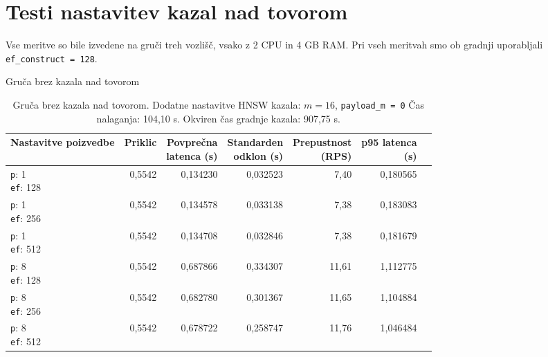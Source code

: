 \section{Testi nastavitev kazal nad tovorom}

Vse meritve so bile izvedene na gruči treh vozlišč, vsako z 2 CPU in 4 GB RAM. Pri vseh meritvah smo ob gradnji uporabljali \texttt{ef\_construct = 128}.

\begin{table}[htbp]
  \centering
\small
  \caption{Gruča brez kazala nad tovorom}
  \label{tab:cluster-2cpu-4ram:no-payload-index:qdrant-dipl-baseline-tenant-no-subgraph-2-m-16-ef-128-random-768-100-tenants-extended-upload-2026-08-17-20-03-18.json}
  \begin{tabularx}{\textwidth}{Xrrrrrr}
    \toprule
    Nastavitve poizvedbe & Priklic & \makecell{Povprečna\\latenca (s)} & \makecell{Standarden\\odklon (s)} & \makecell{Prepustnost\\(RPS)} & \makecell{p95 latenca\\(s)}  \\
    \midrule
    \makecell{\texttt{p}: 1\\\texttt{ef}: 128} & 0,5542 & 0,134230 & 0,032523 & 7,40 & 0,180565 \\
    \makecell{\texttt{p}: 1\\\texttt{ef}: 256} & 0,5542 & 0,134578 & 0,033138 & 7,38 & 0,183083 \\
    \makecell{\texttt{p}: 1\\\texttt{ef}: 512} & 0,5542 & 0,134708 & 0,032846 & 7,38 & 0,181679 \\
    \makecell{\texttt{p}: 8\\\texttt{ef}: 128} & 0,5542 & 0,687866 & 0,334307 & 11,61 & 1,112775 \\
    \makecell{\texttt{p}: 8\\\texttt{ef}: 256} & 0,5542 & 0,682780 & 0,301367 & 11,65 & 1,104884 \\
    \makecell{\texttt{p}: 8\\\texttt{ef}: 512} & 0,5542 & 0,678722 & 0,258747 & 11,76 & 1,046484 \\
    \bottomrule
  \end{tabularx}
\caption* {Gruča brez kazala nad tovorom. Dodatne nastavitve HNSW kazala: $m = 16$, \texttt{payload\_m = 0} Čas nalaganja: 104,10 s. Okviren čas gradnje kazala: 907,75 s.}\end{table}


